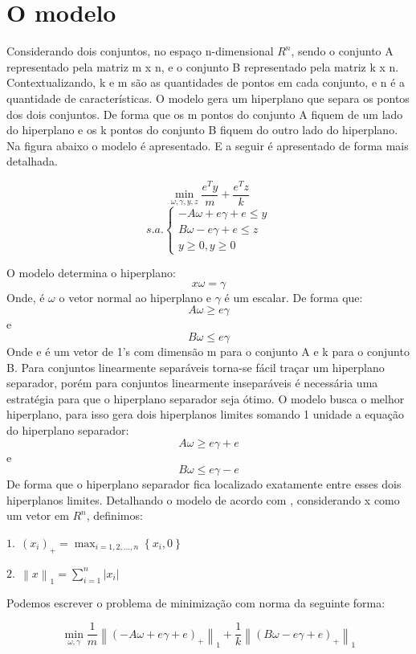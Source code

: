 \section{O modelo}
Considerando dois conjuntos, no espaço n-dimensional $ R^{n} $, sendo o conjunto A representado pela matriz m x n, e o conjunto B representado pela matriz k x n. Contextualizando, k e m são as quantidades de pontos em cada conjunto, e n é a quantidade de características. O modelo gera um hiperplano que separa os pontos dos dois conjuntos. De forma que os m pontos do conjunto A fiquem de um lado do hiperplano e os k pontos do conjunto B fiquem do outro lado do hiperplano. Na figura abaixo o modelo é apresentado. E a seguir é apresentado de forma mais detalhada.

$$\min_{\omega ,\gamma ,y,z}\frac{e^{T}y}{m}+\frac{e^{T}z}{k}$$
$$s.a.\left\{\begin{matrix}-A\omega +e\gamma+e\leq y\\B\omega -e\gamma+e\leq  z\\ y\geq 0,y\geq 0\end{matrix}\right.$$

O modelo determina o hiperplano:
$$ x\omega = \gamma $$
Onde,  é $\omega$ o vetor normal ao hiperplano e $\gamma$ é um escalar. De forma que:
$$A\omega \geq e\gamma$$
e
$$B\omega \leq e\gamma$$
Onde e é um vetor de 1’s com dimensão m para o conjunto A e k para o conjunto B.
Para conjuntos linearmente separáveis torna-se fácil traçar um hiperplano separador, porém para conjuntos linearmente inseparáveis é necessária uma estratégia para que o hiperplano separador seja ótimo.
O modelo busca o melhor hiperplano, para isso gera dois hiperplanos limites somando 1 unidade a equação do hiperplano separador:
$$A\omega \geq e\gamma + e$$
e
$$B\omega \leq e\gamma - e$$
De forma que o hiperplano separador fica localizado exatamente entre esses dois hiperplanos limites.
Detalhando o modelo de acordo com , considerando x como um vetor em $ R^{n} $, definimos:

$1.\ \ (x_{i})_{+} = \max_{i=1,2,...,n}{\left \{x_{i},0  \right \}}$

$2.\ \ \left \| x \right \|_{1} = \sum_{i=1}^{n}\left | x_{i} \right |$

Podemos escrever o problema de minimização com norma da seguinte forma:

$$\min_{\omega ,\gamma }\frac{1}{m}\left \| \left ( -A\omega + e\gamma  + e \right )_{+} \right \|_{1} + \frac{1}{k}\left \| \left ( B\omega - e\gamma + e  \right )_{+} \right \|_{1}$$

